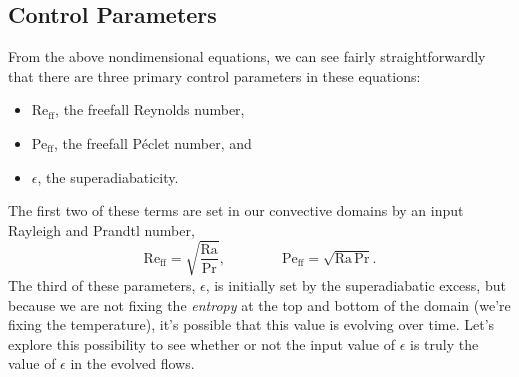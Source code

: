 \documentclass[aps, pre, onecolumn, nofootinbib, notitlepage, groupedaddress, amsfonts, amssymb, amsmath, longbibliography, superscriptaddress]{revtex4-1}
\begin{document}
\subsection{Control Parameters}
From the above nondimensional equations, we can see fairly straightforwardly that there are three primary control parameters in these equations:
\begin{itemize}
\item Re$_{\text{ff}}$, the freefall Reynolds number,
\item Pe$_{\text{ff}}$, the freefall P\'{e}clet number, and
\item $\epsilon$, the superadiabaticity.
\end{itemize}
The first two of these terms are set in our convective domains by an input Rayleigh and Prandtl number,
$$
\text{Re}_{\text{ff}} = \sqrt{\frac{\text{Ra}}{\text{Pr}}}, \qquad\qquad \text{Pe}_{\text{ff}} = \sqrt{\text{Ra}\,\text{Pr}}.
$$
The third of these parameters, $\epsilon$, is initially set by the superadiabatic excess, but because we are not fixing the \emph{entropy} at the top and bottom of the domain (we're fixing the temperature), it's possible that this value is evolving over time.
Let's explore this possibility to see whether or not the input value of $\epsilon$ is truly the value of $\epsilon$ in the evolved flows.
\end{document}
